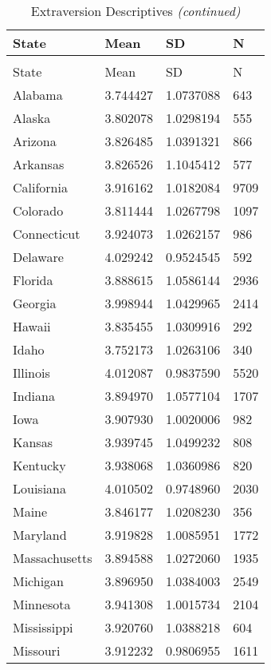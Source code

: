 \documentclass[
]{article}
\begin{document}
\begin{landscape}
\begin{longtable}[t]{llll}
\caption{\label{tab:KableOuput}Extraversion Descriptives}\\
\toprule
State & Mean & SD & N\\
\midrule
\endfirsthead
\caption[]{\label{tab:KableOuput}Extraversion Descriptives \textit{(continued)}}\\
\toprule
State & Mean & SD & N\\
\midrule
\endhead

\endfoot
\bottomrule
\endlastfoot
Alabama & 3.744427 & 1.0737088 & 643\\
Alaska & 3.802078 & 1.0298194 & 555\\
Arizona & 3.826485 & 1.0391321 & 866\\
Arkansas & 3.826526 & 1.1045412 & 577\\
California & 3.916162 & 1.0182084 & 9709\\
\addlinespace
Colorado & 3.811444 & 1.0267798 & 1097\\
Connecticut & 3.924073 & 1.0262157 & 986\\
Delaware & 4.029242 & 0.9524545 & 592\\
Florida & 3.888615 & 1.0586144 & 2936\\
Georgia & 3.998944 & 1.0429965 & 2414\\
\addlinespace
Hawaii & 3.835455 & 1.0309916 & 292\\
Idaho & 3.752173 & 1.0263106 & 340\\
Illinois & 4.012087 & 0.9837590 & 5520\\
Indiana & 3.894970 & 1.0577104 & 1707\\
Iowa & 3.907930 & 1.0020006 & 982\\
\addlinespace
Kansas & 3.939745 & 1.0499232 & 808\\
Kentucky & 3.938068 & 1.0360986 & 820\\
Louisiana & 4.010502 & 0.9748960 & 2030\\
Maine & 3.846177 & 1.0208230 & 356\\
Maryland & 3.919828 & 1.0085951 & 1772\\
\addlinespace
Massachusetts & 3.894588 & 1.0272060 & 1935\\
Michigan & 3.896950 & 1.0384003 & 2549\\
Minnesota & 3.941308 & 1.0015734 & 2104\\
Mississippi & 3.920760 & 1.0388218 & 604\\
Missouri & 3.912232 & 0.9806955 & 1611\\

\end{longtable}
\end{landscape}
\end{document}
